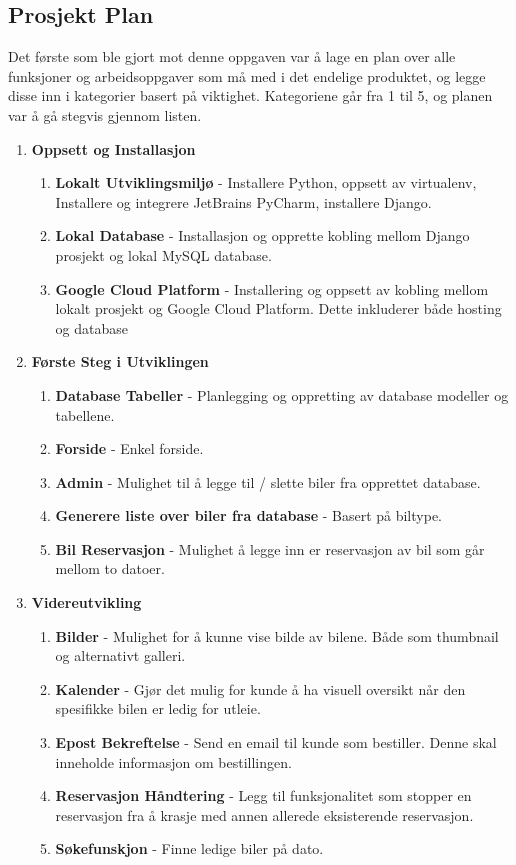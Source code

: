 \subsection{Prosjekt Plan} \label{kravliste2}
Det første som ble gjort mot denne oppgaven var å lage en plan over alle funksjoner og arbeidsoppgaver som må med i det endelige produktet, og legge disse inn i kategorier basert på viktighet. Kategoriene går fra 1 til 5, og planen var å gå stegvis gjennom listen. 
 \begin{enumerate}
 
  \item \textbf{Oppsett og Installasjon}
  \begin{enumerate}
  	\item \textbf{Lokalt Utviklingsmiljø} - Installere Python, oppsett av virtualenv, Installere og integrere JetBrains PyCharm, installere Django.
  	\item \textbf{Lokal Database} - Installasjon og opprette kobling mellom Django prosjekt og lokal MySQL database.
  	\item \textbf{Google Cloud Platform} - Installering og oppsett av kobling mellom lokalt prosjekt og Google Cloud Platform. Dette inkluderer både hosting og database
  \end{enumerate}
  
  \item \textbf{Første Steg i Utviklingen}
  \begin{enumerate}
  	\item \textbf{Database Tabeller} - Planlegging og oppretting av database modeller og tabellene.
  	\item \textbf{Forside} - Enkel forside.
  	\item \textbf{Admin} - Mulighet til å legge til / slette biler fra opprettet database.
  	\item \textbf{Generere liste over biler fra database} - Basert på biltype.
  	\item \textbf{Bil Reservasjon} - Mulighet å legge inn er reservasjon av bil som går mellom to datoer.
  \end{enumerate}
  
  \item \textbf{Videreutvikling}
  \begin{enumerate} 
  	\item \textbf{Bilder} - Mulighet for å kunne vise bilde av bilene. Både som thumbnail og alternativt galleri.
	\item \textbf{Kalender} - Gjør det mulig for kunde å ha visuell oversikt når den spesifikke bilen er ledig for utleie. 
	\item \textbf{Epost Bekreftelse} - Send en email til kunde som bestiller. Denne skal inneholde informasjon om bestillingen.
	\item \textbf{Reservasjon Håndtering} - Legg til funksjonalitet som stopper en reservasjon fra å krasje med annen allerede eksisterende reservasjon.
	\item \textbf{Søkefunskjon} - Finne ledige biler på dato.
  \end{enumerate}
  

\end{enumerate}
